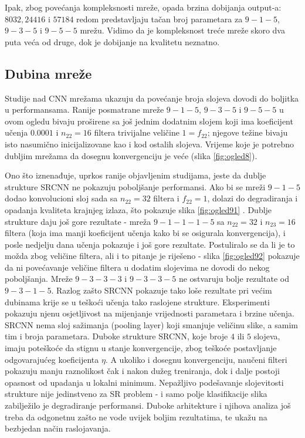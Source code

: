 \documentclass[12pt]{report}
\numberwithin{equation}{section}
\begin{document}
Ipak, zbog povećanja kompleksnosti mreže, opada brzina dobijanja output-a: $8032, 24416$ i $57184$ redom predstavljaju tačan broj parametara za $9-1-5$, $9-3-5$ i $9-5-5$ mrežu. Vidimo da je kompleksnost treće mreže skoro dva puta veća od druge, dok je dobijanje na kvalitetu neznatno.   

  \subsection{Dubina mreže}
   
   Studije nad CNN mrežama ukazuju da povećanje broja slojeva dovodi do boljitka u performansama. Ranije posmatrane mreže $9-1-5$, $9-3-5$ i $9-5-5$ u ovom ogledu bivaju proširene sa još jednim dodatnim slojem koji ima koeficijent učenja $0.0001$ i $n_{22}=16$ filtera trivijalne veličine $1=f_{22}$; njegove težine bivaju isto nasumično inicijalizovane kao i kod ostalih slojeva. Vrijeme koje je potrebno dubljim mrežama da dosegnu konvergenciju je veće (slika \ref{fig:ogled8}). 
   
    Ono što iznenađuje, uprkos ranije objavljenim studijama, jeste da dublje strukture SRCNN ne pokazuju poboljšanje performansi. Ako bi se mreži $9-1-5$ dodao konvolucioni sloj sada sa $n_{22} = 32$ filtera i $f_{22}=1$, dolazi do degradiranja i opadanja kvaliteta krajnjeg izlaza, što pokazuje slika \ref{fig:ogled91} . Dublje strukture daju još gore rezultate - mreža $9-1-1-1-5$ sa $n_{22} = 32$ i $n_{23} = 16$ filtera (koja ima manji koeficijent učenja kako bi se osigurala konvergencija), i posle nedjelju dana učenja pokazuje i još gore rezultate. Postuliralo se da li je to možda zbog veličine filtera, ali i to pitanje je riješeno - slika \ref{fig:ogled92} pokazuje da ni povećavanje veličine filtera u dodatim slojevima ne dovodi do nekog poboljšanja. Mreže $9-3-3-3$ i $9-3-3-5$ ne ostvaruju bolje rezultate od $9-3-1-5$.    
  Razlog zašto SRCNN pokazuje tako loše rezultate pri većim dubinama krije se u teškoći učenja tako raslojene strukture. Eksperimenti pokazuju njenu osjetljivost na mijenjanje vrijednosti parametara i brzine učenja. SRCNN nema sloj sažimanja  (pooling layer)  koji smanjuje veličinu slike, a samim tim i broja parametara. Duboke strukture SRCNN, koje broje $4$ ili $5$ slojeva, imaju poteškoće da stignu u stanje konvergencije, zbog teškoće postavljanje odgovarajućeg koeficijenta $\eta$. A ukoliko i dosegnu konvergenciju, naučeni filteri pokazuju manju raznolikost čak i nakon dužeg treniranja, dok i dalje postoji opasnost od upadanja u lokalni minimum. Nepažljivo podešavanje slojevitosti strukture nije jedinstveno za SR problem - i samo polje klasifikacije slika zabilježilo je degradiranje performansi. Duboke arhitekture i njihova analiza još treba da odgonetnu zašto ne vode uvijek boljim rezultatima, te ukažu na bezbjedan način raslojavanja. 
 
\end{document}
